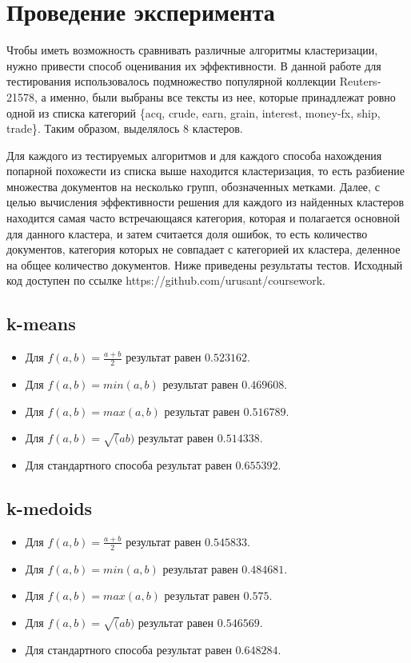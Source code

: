 \section{Проведение эксперимента}
Чтобы иметь возможность сравнивать различные алгоритмы кластеризации, нужно привести способ оценивания их эффективности. В данной работе для тестирования использовалось подмножество популярной коллекции Reuters-21578, а именно, были выбраны все тексты из нее, которые принадлежат ровно одной из списка категорий \{acq, crude, earn, grain, interest, money-fx, ship, trade\}. Таким образом, выделялось 8 кластеров.

Для каждого из тестируемых алгоритмов и для каждого способа нахождения попарной похожести из списка выше находится кластеризация, то есть разбиение множества документов на несколько групп, обозначенных метками. Далее, с целью вычисления эффективности решения для каждого из найденных кластеров находится самая часто встречающаяся категория, которая и полагается основной для данного кластера, и затем считается доля ошибок, то есть количество документов, категория которых не совпадает с категорией их кластера, деленное на общее количество документов. Ниже приведены результаты тестов. Исходный код доступен по ссылке https://github.com/urusant/coursework.

\subsection{k-means}
\begin{itemize}
\item Для $f(a, b) = \frac{a + b}{2}$ результат равен $0.523162$.
\item Для $f(a, b) = min(a, b)$ результат равен $0.469608$.
\item Для $f(a, b) = max(a, b)$ результат равен $0.516789$.
\item Для $f(a, b) = \sqrt(ab)$ результат равен $0.514338$.
\item Для стандартного способа результат равен $0.655392$.
\end{itemize}

\subsection{k-medoids}
\begin{itemize}
\item Для $f(a, b) = \frac{a + b}{2}$ результат равен $0.545833$.
\item Для $f(a, b) = min(a, b)$ результат равен $0.484681$.
\item Для $f(a, b) = max(a, b)$ результат равен $0.575$.
\item Для $f(a, b) = \sqrt(ab)$ результат равен $0.546569$.
\item Для стандартного способа результат равен $0.648284$.
\end{itemize}

